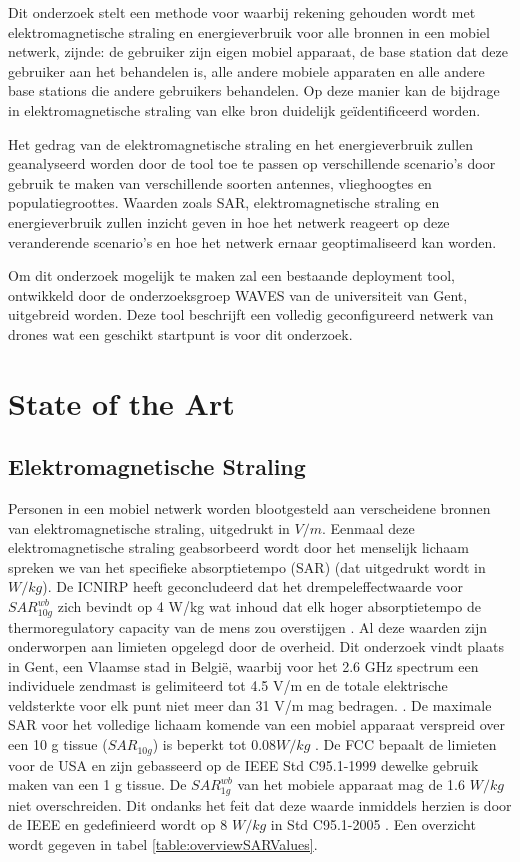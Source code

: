 \documentclass[twocolumn]{phdsymp_dutch}
\begin{document}
Dit onderzoek stelt een methode voor waarbij rekening gehouden wordt met 
elektromagnetische straling en energieverbruik voor alle bronnen in een mobiel netwerk, zijnde: de gebruiker zijn eigen 
mobiel apparaat, de base station dat deze gebruiker aan het behandelen is, alle andere mobiele apparaten en 
alle andere base stations die andere gebruikers behandelen. Op deze manier kan de bijdrage in elektromagnetische straling
 van elke bron duidelijk geïdentificeerd worden. 

Het gedrag van de elektromagnetische straling en het energieverbruik zullen geanalyseerd worden door de 
tool toe te passen op verschillende scenario's door gebruik te maken van verschillende soorten antennes, vlieghoogtes 
en populatiegroottes.
Waarden zoals \gls{SAR}, elektromagnetische straling en energieverbruik zullen inzicht 
geven in hoe het netwerk reageert op deze veranderende scenario's en hoe het netwerk 
ernaar geoptimaliseerd kan worden.

Om dit onderzoek mogelijk te maken zal een bestaande deployment tool, ontwikkeld
door de onderzoeksgroep WAVES van de universiteit van Gent, uitgebreid worden. Deze tool 
beschrijft een volledig geconfigureerd netwerk van drones wat een geschikt startpunt is voor dit onderzoek.

\section{State of the Art}
\subsection{Elektromagnetische Straling}

Personen in een mobiel netwerk worden blootgesteld aan verscheidene bronnen van elektromagnetische straling, uitgedrukt in $V/m$.
Eenmaal deze elektromagnetische straling geabsorbeerd wordt door het menselijk lichaam spreken we van het specifieke absorptietempo (\gls{SAR}) (dat uitgedrukt wordt in $W/kg$).
De \gls{ICNIRP} heeft geconcludeerd dat het drempeleffectwaarde voor $SAR^{wb}_{10g}$ zich bevindt op 
 4 W/kg wat inhoud dat elk hoger absorptietempo de \gls{thermoregulatory capacity} van de mens 
 zou overstijgen  \cite{J23,J24}.
Al deze waarden zijn onderworpen aan limieten opgelegd door de overheid.
Dit onderzoek vindt plaats in Gent, een Vlaamse stad in Belgi\"e, waarbij voor het 2.6 GHz spectrum een individuele zendmast 
is gelimiteerd tot 4.5 V/m en de totale elektrische veldsterkte voor elk punt niet meer dan 31 V/m mag bedragen.  \cite{J23,S13_normenBelgie}. 
De maximale \gls{SAR} voor het volledige lichaam komende van een mobiel apparaat verspreid over een 
10 g tissue ($SAR_{10g}$) is beperkt tot $0.08 W/kg$ \cite{J30,J23,S20}. 
De \gls{FCC} bepaalt de limieten voor de \gls{USA} en zijn gebasseerd op de 
\gls{IEEE} Std C95.1-1999 \cite{P1,P2} dewelke gebruik maken van een 1 g tissue.
De $SAR^{wb}_{1g}$ van het mobiele apparaat mag de 
1.6 $W/kg$ niet overschreiden. Dit ondanks het feit dat deze waarde inmiddels herzien is door 
de  \gls{IEEE} en gedefinieerd wordt op 8 $W/kg$ in Std C95.1-2005 \cite{P2}.
Een overzicht wordt gegeven in tabel \ref{table:overviewSARValues}.
\end{document}
